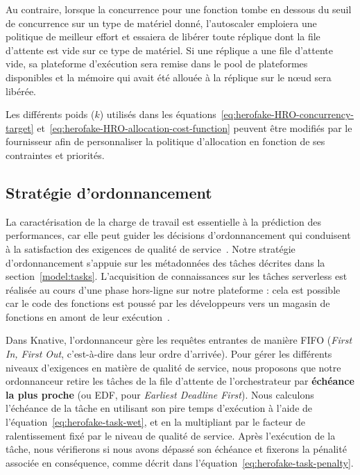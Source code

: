 Au contraire, lorsque la concurrence pour une fonction tombe en dessous du seuil de concurrence sur un type de matériel donné, l'autoscaler emploiera une politique de meilleur effort et essaiera de libérer toute réplique dont la file d'attente est vide sur ce type de matériel. Si une réplique a une file d'attente vide, sa plateforme d'exécution sera remise dans le pool de plateformes disponibles et la mémoire qui avait été allouée à la réplique sur le nœud sera libérée.

Les différents poids ($k$) utilisés dans les équations~\ref{eq:herofake-HRO-concurrency-target} et~\ref{eq:herofake-HRO-allocation-cost-function} peuvent être modifiés par le fournisseur afin de personnaliser la politique d'allocation en fonction de ses contraintes et priorités.

\subsection{Stratégie d'ordonnancement} \label{section:herofake-scheduling-strategy}

La caractérisation de la charge de travail est essentielle à la prédiction des performances, car elle peut guider les décisions d'ordonnancement qui conduisent à la satisfaction des exigences de qualité de service~\cite{mampageHolisticViewResource2022}. Notre stratégie d'ordonnancement s'appuie sur les métadonnées des tâches décrites dans la section~\ref{model:tasks}. L'acquisition de connaissances sur les tâches serverless est réalisée au cours d'une phase hors-ligne sur notre plateforme : cela est possible car le code des fonctions est poussé par les développeurs vers un magasin de fonctions en amont de leur exécution~\cite{shahradServerlessWildCharacterizing}.

Dans Knative, l'ordonnanceur gère les requêtes entrantes de manière FIFO (\textit{First In, First Out}, c'est-à-dire dans leur ordre d'arrivée). Pour gérer les différents niveaux d'exigences en matière de qualité de service, nous proposons que notre ordonnanceur retire les tâches de la file d'attente de l'orchestrateur par \textbf{échéance la plus proche} (ou EDF, pour \textit{Earliest Deadline First}). Nous calculons l'échéance de la tâche en utilisant son pire temps d'exécution à l'aide de l'équation~\ref{eq:herofake-task-wet}, et en la multipliant par le facteur de ralentissement fixé par le niveau de qualité de service. Après l'exécution de la tâche, nous vérifierons si nous avons dépassé son échéance et fixerons la pénalité associée en conséquence, comme décrit dans l'équation~\ref{eq:herofake-task-penalty}. 

